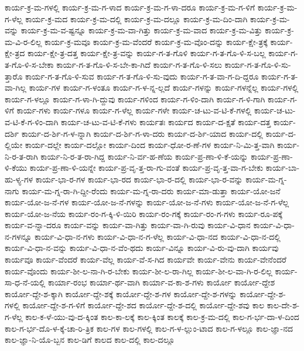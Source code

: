 {ಕಾರ್ಯ-ಕ್ರ-ಮ-ಗಳಲ್ಲಿ
ಕಾರ್ಯ-ಕ್ರ-ಮ-ಗ-ಳಾದ
ಕಾರ್ಯ-ಕ್ರ-ಮ-ಗ-ಳಾ-ದರೂ
ಕಾರ್ಯ-ಕ್ರ-ಮ-ಗ-ಳಿಗೆ
ಕಾರ್ಯ-ಕ್ರ-ಮ-ಗ-ಳೆಲ್ಲ
ಕಾರ್ಯ-ಕ್ರ-ಮದ
ಕಾರ್ಯ-ಕ್ರ-ಮ-ದಲ್ಲಿ
ಕಾರ್ಯ-ಕ್ರ-ಮ-ದಲ್ಲೂ
ಕಾರ್ಯ-ಕ್ರ-ಮ-ದಿಂ-ದಾಗಿ
ಕಾರ್ಯ-ಕ್ರ-ಮ-ವನ್ನು
ಕಾರ್ಯ-ಕ್ರ-ಮ-ವ-ಷ್ಟನ್ನೂ
ಕಾರ್ಯ-ಕ್ರ-ಮ-ವಾ-ಗಿತ್ತು
ಕಾರ್ಯ-ಕ್ರ-ಮ-ವಾದ
ಕಾರ್ಯ-ಕ್ರ-ಮ-ವಿತ್ತು
ಕಾರ್ಯ-ಕ್ರ-ಮ-ವಿ-ರ-ಲಿಲ್ಲ
ಕಾರ್ಯ-ಕ್ರ-ಮವೂ
ಕಾರ್ಯ-ಕ್ರ-ಮ-ವೆಂದರೆ
ಕಾರ್ಯ-ಕ್ರ-ಮ-ವೊಂ-ದನ್ನು
ಕಾರ್ಯ-ಕ್ಷೇ-ತ್ರಕ್ಕೆ
ಕಾರ್ಯ-ಕ್ಷೇ-ತ್ರದ
ಕಾರ್ಯ-ಕ್ಷೇ-ತ್ರ-ದತ್ತ
ಕಾರ್ಯ-ಕ್ಷೇ-ತ್ರ-ವನ್ನು
ಕಾರ್ಯ-ಗ-ತ-ಗೊಳಿ
ಕಾರ್ಯ-ಗ-ತ-ಗೊ-ಳಿ-ಸ-ಬಲ್ಲ
ಕಾರ್ಯ-ಗ-ತ-ಗೊ-ಳಿ-ಸ-ಬೇಕಾ
ಕಾರ್ಯ-ಗ-ತ-ಗೊ-ಳಿ-ಸ-ಬೇ-ಕಾ-ಗಿದೆ
ಕಾರ್ಯ-ಗ-ತ-ಗೊ-ಳಿ-ಸಲು
ಕಾರ್ಯ-ಗ-ತ-ಗೊ-ಳಿ-ಸು-ತ್ತಾರೊ
ಕಾರ್ಯ-ಗ-ತ-ಗೊ-ಳಿ-ಸುವ
ಕಾರ್ಯ-ಗ-ತ-ಗೊ-ಳಿ-ಸು-ವುದು
ಕಾರ್ಯ-ಗ-ತ-ವಾ-ಗ-ದಿ-ದ್ದರೂ
ಕಾರ್ಯ-ಗ-ತ-ವಾ-ಗಿಲ್ಲ
ಕಾರ್ಯ-ಗಳ
ಕಾರ್ಯ-ಗ-ಳಂತೂ
ಕಾರ್ಯ-ಗ-ಳ-ನ್ನ-ಲ್ಲದೆ
ಕಾರ್ಯ-ಗಳನ್ನು
ಕಾರ್ಯ-ಗಳನ್ನೆಲ್ಲ
ಕಾರ್ಯ-ಗಳಲ್ಲಿ
ಕಾರ್ಯ-ಗ-ಳಲ್ಲೂ
ಕಾರ್ಯ-ಗ-ಳಾ-ಗಿ-ದ್ದುವು
ಕಾರ್ಯ-ಗಳಿಂದ
ಕಾರ್ಯ-ಗ-ಳಿಂ-ದಾಗಿ
ಕಾರ್ಯ-ಗ-ಳಿ-ಗಾಗಿ
ಕಾರ್ಯ-ಗ-ಳಿಗೆ
ಕಾರ್ಯ-ಗಳು
ಕಾರ್ಯ-ಗಳೂ
ಕಾರ್ಯ-ಗ-ಳೆಲ್ಲ
ಕಾರ್ಯ-ಗಳೇ
ಕಾರ್ಯ-ಚ-ಟು-ವ-ಟಿ-ಕೆ-ಗಳಲ್ಲಿ
ಕಾರ್ಯ-ಚ-ಟು-ವ-ಟಿ-ಕೆ-ಗ-ಳಿಂ-ದಾಗಿ
ಕಾರ್ಯ-ಚ-ಟು-ವ-ಟಿ-ಕೆ-ಗಳು
ಕಾರ್ಯತಃ
ಕಾರ್ಯದ
ಕಾರ್ಯ-ದ-ಕ್ಷತೆ
ಕಾರ್ಯ-ದತ್ತ
ಕಾರ್ಯ-ದರ್ಶಿ
ಕಾರ್ಯ-ದ-ರ್ಶಿ-ಗ-ಳ-ನ್ನಾಗಿ
ಕಾರ್ಯ-ದ-ರ್ಶಿ-ಗ-ಳಾ-ದರು
ಕಾರ್ಯ-ದ-ರ್ಶಿ-ಯಾದ
ಕಾರ್ಯ-ದಲ್ಲಿ
ಕಾರ್ಯ-ದ-ಲ್ಲಿಯೇ
ಕಾರ್ಯ-ದಲ್ಲೇ
ಕಾರ್ಯ-ದಲ್ಲೋ
ಕಾರ್ಯ-ದಿಂದ
ಕಾರ್ಯ-ಧೋ-ರ-ಣೆ-ಗಳ
ಕಾರ್ಯ-ನಿ-ಮಿ-ತ್ತ-ವಾಗಿ
ಕಾರ್ಯ-ನಿ-ರ-ತ-ರಾಗಿ
ಕಾರ್ಯ-ನಿ-ರ-ತ-ರಾ-ಗಿದ್ದ
ಕಾರ್ಯ-ನಿ-ರ್ವ-ಹ-ಣೆಯ
ಕಾರ್ಯ-ಪ್ರ-ಣಾ-ಳಿ-ಕೆ-ಯನ್ನು
ಕಾರ್ಯ-ಪ್ರ-ಣಾ-ಳಿ-ಕೆಯು
ಕಾರ್ಯ-ಪ್ರ-ಣಾ-ಳಿ-ಯನ್ನೇ
ಕಾರ್ಯ-ಪ್ರ-ವೃ-ತ್ತ-ರಾ-ಗು-ವಂತೆ
ಕಾರ್ಯ-ಪ್ರ-ವೃ-ತ್ತ-ವಾ-ಗ-ಬೇಕು
ಕಾರ್ಯ-ಬಾ-ಹು-ಳ್ಯ-ಗಳ
ಕಾರ್ಯ-ಭಾ-ರ-ಗಳ
ಕಾರ್ಯ-ಭಾ-ರದ
ಕಾರ್ಯ-ಭಾ-ರ-ದಲ್ಲಿ
ಕಾರ್ಯ-ಭಾ-ರ-ವನ್ನು
ಕಾರ್ಯ-ಮ-ಗ್ನ-ನಾಗು
ಕಾರ್ಯ-ಮ-ಗ್ನ-ರಾ-ಗಿ-ದ್ದೀ-ರೆಂದು
ಕಾರ್ಯ-ಮ-ಗ್ನ-ರಾ-ದರು
ಕಾರ್ಯ-ಮಾ-ಡುತ್ತಾ
ಕಾರ್ಯ-ಯೋ-ಜನೆ
ಕಾರ್ಯ-ಯೋ-ಜ-ನೆ-ಗಳ
ಕಾರ್ಯ-ಯೋ-ಜ-ನೆ-ಗಳನ್ನು
ಕಾರ್ಯ-ಯೋ-ಜ-ನೆ-ಗಳು
ಕಾರ್ಯ-ಯೋ-ಜ-ನೆ-ಗ-ಳೆಲ್ಲ
ಕಾರ್ಯ-ಯೋ-ಜ-ನೆಯ
ಕಾರ್ಯ-ರಂ-ಗ-ಕ್ಕಿ-ಳಿ-ಯಿರಿ
ಕಾರ್ಯ-ರಂ-ಗಕ್ಕೆ
ಕಾರ್ಯ-ರಂ-ಗ-ಗಳು
ಕಾರ್ಯ-ರೂ-ಪಕ್ಕೆ
ಕಾರ್ಯ-ವ-ನ್ನಾ-ದರೂ
ಕಾರ್ಯ-ವನ್ನು
ಕಾರ್ಯ-ವಾ-ಗಿತ್ತು
ಕಾರ್ಯ-ವಾ-ಗಿ-ರುವು
ಕಾರ್ಯ-ವಿ-ಧಾನ
ಕಾರ್ಯ-ವಿ-ಧಾ-ನ-ಗಳನ್ನೂ
ಕಾರ್ಯ-ವಿ-ಧಾ-ನ-ಗಳು
ಕಾರ್ಯ-ವಿ-ಧಾ-ನ-ಗ-ಳೆಲ್ಲ
ಕಾರ್ಯ-ವಿ-ಧಾ-ನದ
ಕಾರ್ಯ-ವಿ-ಧಾ-ನ-ದಲ್ಲಿ
ಕಾರ್ಯ-ವಿ-ಧಾ-ನ-ವನ್ನು
ಕಾರ್ಯ-ವಿ-ಧಾ-ನ-ವೆಂ-ಥದು
ಕಾರ್ಯ-ವಿನ್ನೂ
ಕಾರ್ಯ-ವಿ-ರು-ವು-ದಾಗಿ
ಕಾರ್ಯವು
ಕಾರ್ಯವೂ
ಕಾರ್ಯ-ವೆಂದರೆ
ಕಾರ್ಯ-ವೆಲ್ಲ
ಕಾರ್ಯ-ವೆ-ಸ-ಗಿದ
ಕಾರ್ಯವೇ
ಕಾರ್ಯ-ವೇನು
ಕಾರ್ಯ-ವೇನೆಂದರೆ
ಕಾರ್ಯ-ವೊಂದು
ಕಾರ್ಯ-ಶೀ-ಲ-ನಾ-ಗಿ-ರ-ಬೇಕು
ಕಾರ್ಯ-ಶೀ-ಲ-ರಾ-ಗಿಲ್ಲ
ಕಾರ್ಯ-ಶೀ-ಲ-ವಾ-ಗಿ-ರ-ಲಿಲ್ಲ
ಕಾರ್ಯ-ಸಾ-ಧ-ನೆ-ಯಲ್ಲಿ
ಕಾರ್ಯಾ-ರಂಭ
ಕಾರ್ಯಾ-ರ್ಥ-ವಾಗಿ
ಕಾರ್ಯಾ-ವ-ಕಾ-ಶ-ಗಳು
ಕಾರ್ಯೋ
ಕಾರ್ಯೋ-ದ್ದೇಶ
ಕಾರ್ಯೋ-ದ್ದೇ-ಶ-ಕ್ಕಾಗಿ
ಕಾರ್ಯೋ-ದ್ದೇ-ಶಕ್ಕೆ
ಕಾರ್ಯೋ-ದ್ದೇ-ಶ-ಗಳ
ಕಾರ್ಯೋ-ದ್ದೇ-ಶ-ಗಳನ್ನು
ಕಾರ್ಯೋ-ದ್ದೇ-ಶ-ಗಳಲ್ಲಿ
ಕಾರ್ಯೋ-ದ್ದೇ-ಶ-ಗ-ಳಿಗೆ
ಕಾರ್ಯೋ-ದ್ದೇ-ಶದ
ಕಾರ್ಯೋ-ದ್ದೇ-ಶ-ದಲ್ಲಿ
ಕಾರ್ಯೋ-ದ್ದೇ-ಶವು
ಕಾಲ
ಕಾಲ-ದೇ-ಶ-ಗ-ಳೆಲ್ಲ
ಕಾಲ-ಕ-ಳೆ-ಯು-ವು-ದ-ಕ್ಕಿಂತ
ಕಾಲ-ಕಾ-ಲಕ್ಕೆ
ಕಾಲ-ಕ್ಕಿಂತ
ಕಾಲಕ್ಕೆ
ಕಾಲ-ಕ್ರ-ಮ-ದಲ್ಲಿ
ಕಾಲ-ಗ-ರ್ಭ-ದಾ-ಳ-ದಿಂದ
ಕಾಲ-ಗ-ರ್ಭ-ದೊ-ಳ-ಕ್ಕೆ-ಚಾ-ರಿ-ತ್ರಿಕ
ಕಾಲ-ಗಳ
ಕಾಲ-ಗಳಲ್ಲಿ
ಕಾಲ-ಗ-ಳ-ಲ್ಲುಂ-ಟಾದ
ಕಾಲ-ಗ-ಳಲ್ಲೂ
ಕಾಲ-ಜ್ಞಾ-ನದ
ಕಾಲ-ಜ್ಞಾ-ನಿ-ಯೊ-ಬ್ಬನ
ಕಾಲ-ಡಿಗೆ
ಕಾಲದ
ಕಾಲ-ದಲ್ಲಿ
ಕಾಲ-ದಲ್ಲೂ
}

